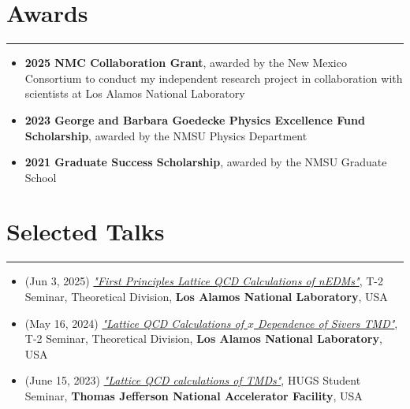 \documentclass[11pt]{article}
\begin{document}
\section*{Awards}
\hrule
\vspace{-0.3em}

\begin{itemize}
    \item \textbf{2025 NMC Collaboration Grant}, awarded by the New Mexico Consortium to conduct my independent research project in collaboration with scientists at Los Alamos National Laboratory
    \vspace{-0.5em}
    \item \textbf{2023 George and Barbara Goedecke Physics Excellence Fund Scholarship}, awarded by the NMSU Physics Department
    \vspace{-0.5em}
    \item \textbf{2021 Graduate Success Scholarship}, awarded by the NMSU Graduate School
\end{itemize}

\section*{Selected Talks}
\hrule
\vspace{-0.3em}
\begin{itemize}
    \item (Jun 3, 2025) \href{https://hariprashad-ravikumar.github.io/talks/Los_Alamos_T2_talk_First_Principles_Lattice_QCD_Calculations_of_nEDMs__presentation_Hari_NMSU_June_03_2025.pdf}{\textit{"First Principles Lattice QCD Calculations of nEDMs"}}, T-2 Seminar, Theoretical Division, \textbf{Los Alamos National Laboratory}, USA


    \item (May 16, 2024) \href{https://hariprashad-ravikumar.github.io/talks/Lattice_QCD_calculations_of_Sivers_TMD_x_dependance____presentation_Hari__NMSU_May_16_2024.pdf}{\textit{"Lattice QCD Calculations of $x$ Dependence of Sivers TMD"}}, T-2 Seminar, Theoretical Division, \textbf{Los Alamos National Laboratory}, USA

    \item (June 15, 2023) \href{https://indico.jlab.org/event/717/contributions/12720/attachments/9865/14525/Lattice_QCD_calculations_of_TMDs_HUGS_presentation_Hari_NMSU_Jun_15_2023__updated_%20(1).pdf}{\textit{"Lattice QCD calculations of TMDs"}}, HUGS Student Seminar, \textbf{Thomas Jefferson National Accelerator Facility}, USA
\end{itemize}
\end{document}
